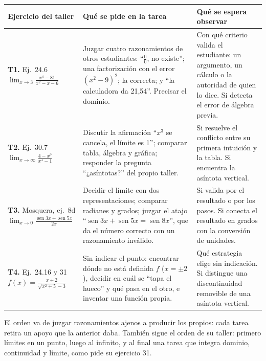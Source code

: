 \documentclass[11pt,letterpaper]{article}
\DeclareMathOperator{\seno}{sen}
\begin{document}
\begin{center}\footnotesize
\renewcommand{\arraystretch}{1.25}
\begin{tabularx}{\linewidth}{@{}p{3.3cm}LL@{}}
\toprule
\textbf{Ejercicio del taller} & \textbf{Qué se pide en la tarea} & \textbf{Qué se espera observar} \\
\midrule
\textbf{T1.} Ej.~24.6\newline $\displaystyle\lim_{x\to3}\frac{x^4-81}{x^2-x-6}$ & Juzgar cuatro razonamientos de otros estudiantes: ``$\frac00$, no existe''; una factorización con el error $(x^2-9)^2$; la correcta; y ``la calculadora da 21,54''. Precisar el dominio. & Con qué criterio valida el estudiante: un argumento, un cálculo o la autoridad de quien lo dice. Si detecta el error de álgebra previa. \\
\midrule
\textbf{T2.} Ej.~30.7\newline $\displaystyle\lim_{x\to\infty}\frac{4-x^3}{x^3-1}$ & Discutir la afirmación ``$x^3$ se cancela, el límite es 1''; comparar tabla, álgebra y gráfica; responder la pregunta ``¿asíntotas?'' del propio taller. & Si resuelve el conflicto entre su primera intuición y la tabla. Si encuentra la asíntota vertical. \\
\midrule
\textbf{T3.} Mosquera, ej.~8d\newline $\displaystyle\lim_{x\to0}\frac{\seno 3x+\seno 5x}{2x}$ & Decidir el límite con dos representaciones; comparar radianes y grados; juzgar el atajo ``$\seno 3x+\seno 5x=\seno 8x$'', que da el número correcto con un razonamiento inválido. & Si valida por el resultado o por los pasos. Si conecta el resultado en grados con la conversión de unidades. \\
\midrule
\textbf{T4.} Ej.~24.16 y 31\newline $\displaystyle f(x)=\frac{x+2}{\sqrt{x^2+5}-3}$ & Sin indicar el punto: encontrar dónde no está definida $f$ ($x=\pm2$), decidir en cuál se ``tapa el hueco'' y qué pasa en el otro, e inventar una función propia. & Qué estrategia elige sin indicación. Si distingue una discontinuidad removible de una asíntota vertical. \\
\bottomrule
\end{tabularx}
\end{center}

El orden va de juzgar razonamientos ajenos a producir los propios: cada tarea retira un apoyo que la anterior daba. También sigue el orden de su taller: primero límites en un punto, luego al infinito, y al final una tarea que integra dominio, continuidad y límite, como pide su ejercicio 31.
\end{document}
